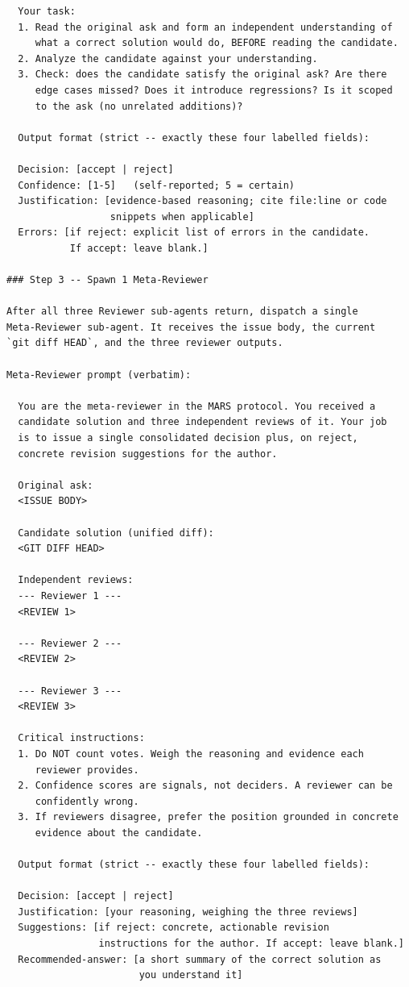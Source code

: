 \documentclass{article}
\begin{document}
\begin{footnotesize}
\begin{verbatim}
  Your task:
  1. Read the original ask and form an independent understanding of
     what a correct solution would do, BEFORE reading the candidate.
  2. Analyze the candidate against your understanding.
  3. Check: does the candidate satisfy the original ask? Are there
     edge cases missed? Does it introduce regressions? Is it scoped
     to the ask (no unrelated additions)?

  Output format (strict -- exactly these four labelled fields):

  Decision: [accept | reject]
  Confidence: [1-5]   (self-reported; 5 = certain)
  Justification: [evidence-based reasoning; cite file:line or code
                  snippets when applicable]
  Errors: [if reject: explicit list of errors in the candidate.
           If accept: leave blank.]

### Step 3 -- Spawn 1 Meta-Reviewer

After all three Reviewer sub-agents return, dispatch a single
Meta-Reviewer sub-agent. It receives the issue body, the current
`git diff HEAD`, and the three reviewer outputs.

Meta-Reviewer prompt (verbatim):

  You are the meta-reviewer in the MARS protocol. You received a
  candidate solution and three independent reviews of it. Your job
  is to issue a single consolidated decision plus, on reject,
  concrete revision suggestions for the author.

  Original ask:
  <ISSUE BODY>

  Candidate solution (unified diff):
  <GIT DIFF HEAD>

  Independent reviews:
  --- Reviewer 1 ---
  <REVIEW 1>

  --- Reviewer 2 ---
  <REVIEW 2>

  --- Reviewer 3 ---
  <REVIEW 3>

  Critical instructions:
  1. Do NOT count votes. Weigh the reasoning and evidence each
     reviewer provides.
  2. Confidence scores are signals, not deciders. A reviewer can be
     confidently wrong.
  3. If reviewers disagree, prefer the position grounded in concrete
     evidence about the candidate.

  Output format (strict -- exactly these four labelled fields):

  Decision: [accept | reject]
  Justification: [your reasoning, weighing the three reviews]
  Suggestions: [if reject: concrete, actionable revision
                instructions for the author. If accept: leave blank.]
  Recommended-answer: [a short summary of the correct solution as
                       you understand it]


\end{verbatim}
\end{footnotesize}
\end{document}
